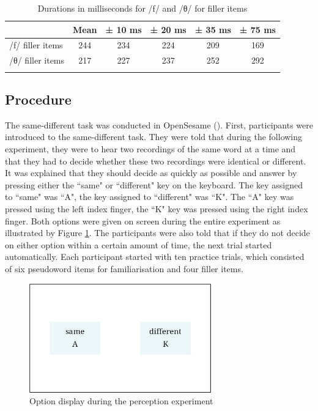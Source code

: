 \begin{table}\fontsize{10}{11}
\caption{Durations in milliseconds for /f/ and /θ/ for filler items}
\label{tab:6.7}
\centering
\begin{tabular}{lccccc} 
\lsptoprule
~             & Mean & ± 10 ms & ± 20 ms & ± 35 ms & ± 75 ms  \\ 
\midrule
/f/ filler items & 244  & 234     & 224     & 209     & 169      \\
/θ/ filler items & 217  & 227     & 237     & 252     & 292      \\
\lspbottomrule
\end{tabular}
\end{table}

\subsection{Procedure}\label{section06_1_3}

The same-different task was conducted in OpenSesame (\cite{Mathot2012}). First, participants were introduced to the same-different task. They were told that during the following experiment, they were to hear two recordings of the same word at a time and that they had to decide whether these two recordings were identical or different. It was explained that they should decide as quickly as possible and answer by pressing either the ``same" or ``different" key on the keyboard. The key assigned to ``same" was ``A", the key assigned to ``different" was ``K". The ``A" key was pressed using the left index finger, the ``K" key was pressed using the right index finger. Both options were given on screen during the entire experiment as illustrated by Figure \ref{fig:6_1}. The participants were also told that if they do not decide on either option within a certain amount of time, the next trial started automatically. Each participant started with ten practice trials, which consisted of six pseudoword items for familiarisation and four filler items.

\begin{figure}
    \centering
    \includegraphics[width=0.7\textwidth]{figures/fig6.1.png}
    \caption{Option display during the perception experiment}
    \label{fig:6_1}
\end{figure}


